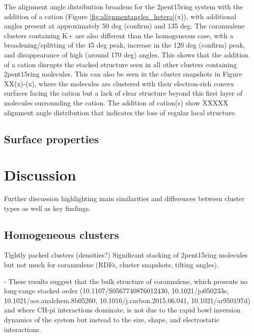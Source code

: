 The alignment angle distribution broadens for the 2pent15ring system with the addition of a cation (Figure \ref{fig:alignmentangles_hetero}(x)), with additional angles present at approximately 50 deg (confirm) and 135 deg.
The corannulene clusters containing K+ are also different than the homogeneous case, with a broadening/splitting of the 45 deg peak, increase in the 120 deg (confirm) peak, and disappearance of high (around 170 deg) angles. This shows that the addition of a cation disrupts the stacked structure seen in all other clusters containing 2pent15ring molecules. This can also be seen in the cluster snapshots in Figure XX(x)-(x), where the molecules are clustered with their electron-rich convex surfaces facing the cation but a lack of clear structure beyond this first layer of molecules surrounding the cation.
The addition of cation(s) show XXXXX alignment angle distribution that indicates the loss of regular local structure.


\subsection{Surface properties}



\section{Discussion}
Further discussion highlighting main similarities and differences between cluster types as well as key findings.

\subsection{Homogeneous clusters}
Tightly packed clusters (densities?)
Significant stacking of 2pent15ring molecules but not much for corannulene (RDFs, cluster snapshots, tilting angles).

- These results suggest that the bulk structure of corannulene, which presents no long-range stacked order (10.1107/S0567740876012430, 10.1021/jo050233e, 10.1021/acs.analchem.8b05260, 10.1016/j.carbon.2015.06.041, 10.1021/ar950197d) and where CH-pi interactions dominate, is not due to the rapid bowl inversion dynamics of the system but instead to the size, shape, and electrostatic interactions.


